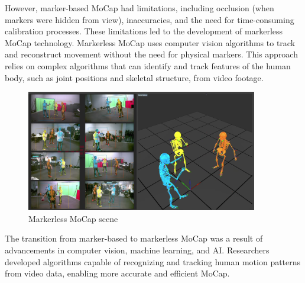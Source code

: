 However, marker-based MoCap had limitations, including occlusion 
(when markers were hidden from view), inaccuracies, and the need for time-consuming calibration processes. 
These limitations led to the development of markerless MoCap technology. 
Markerless MoCap uses computer vision algorithms to track and reconstruct movement without the need for physical markers. 
This approach relies on complex algorithms that can identify and track features of the human body, 
such as joint positions and skeletal structure, from video footage.
\begin{figure}[H]
    \centering
    \includegraphics[width=0.9\textwidth]{graphics/MoCapMarkerlessQualisys.png}
    \caption{Markerless MoCap scene}
    \label{fig:mocap}
\end{figure}

The transition from marker-based to markerless MoCap was a result of advancements in computer vision, machine learning, and AI. 
Researchers developed algorithms capable of recognizing and tracking human motion patterns from video data, 
enabling more accurate and efficient MoCap.

